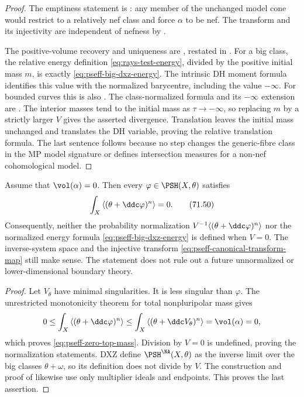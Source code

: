 \begin{proof}
The emptiness statement is
: any member of the unchanged
model cone would restrict to a relatively nef class and force $\alpha$
to be nef.  The transform and its injectivity are independent of nefness
by
.

The positive-volume recovery and uniqueness are
\cite[Lemma~3.10]{Xia23Operations}, restated in
.  For a big
class, the relative energy definition \eqref{eq:rays-test-energy},
divided by the positive initial mass $m$, is exactly
\eqref{eq:pseff-big-dxz-energy}. The intrinsic DH moment formula
 identifies this value with the normalized
barycentre, including the value $-\infty$. For bounded curves this is
also . The class-normalized formula and
its $-\infty$ extension are \cite[formula~(43)]{DXZ23}.
The interior masses tend to the initial mass as $\tau\to-\infty$,
so replacing $m$ by a strictly larger $V$ gives the asserted
divergence. Translation leaves the initial mass unchanged and translates
the DH variable, proving the relative translation formula.  The last sentence follows because no
step changes the generic-fibre class in the MP model signature or defines
intersection measures for a non-nef cohomological model.
\end{proof}

\begin{proposition}\label{prop:pseff-zero-volume-boundary}
Assume that $\vol(\alpha)=0$.  Then every
$\varphi\in\PSH(X,\theta)$ satisfies
\[
 \int_X\left\langle
       (\theta+\ddc\varphi)^n
 \right\rangle=0.
\tag{71.50}\label{eq:pseff-zero-top-mass}
\]
Consequently, neither the probability normalization
$V^{-1}\langle(\theta+\ddc\varphi)^n\rangle$ nor the normalized energy
formula \eqref{eq:pseff-big-dxz-energy} is defined when $V=0$.
The inverse-system space and the injective transform
\eqref{eq:pseff-canonical-transform-map} still make sense.  The statement
does not rule out a future unnormalized or lower-dimensional boundary
theory.
\end{proposition}

\begin{proof}
Let $V_\theta$ have minimal singularities.  It is less singular than
$\varphi$.  The unrestricted monotonicity theorem for total
nonpluripolar mass \cite[Theorem~1.1]{DDNL18mono} gives
\[
 0\leq\int_X\left\langle
       (\theta+\ddc\varphi)^n
      \right\rangle
 \leq\int_X\left\langle
       (\theta+\ddc V_\theta)^n
      \right\rangle
 =\vol(\alpha)=0,
\]
which proves \eqref{eq:pseff-zero-top-mass}.  Division by $V=0$ is
undefined, proving the normalization statements.  DXZ define
$\PSH^{\NA}(X,\theta)$ as the inverse limit over the big classes
$\theta+\omega$, so its definition does not divide by $V$.
The construction and proof of
 likewise use only
multiplier ideals and endpoints.  This proves the last assertion.
\end{proof}

